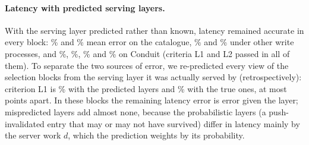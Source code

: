 \documentclass[acmsmall,review,nonacm]{acmart}
\begin{document}
\paragraph{Latency with predicted serving layers.}
With the serving layer predicted rather than known, latency remained accurate in every block: \revTLone\% and \revRLone\% mean error on the catalogue, \revBTwoTLone\% and \revBTwoRLone\% under other write processes, and \cdTLone\%, \cdRLone\%, \cdHTLone\% and \cdHRLone\% on Conduit (criteria L1 and L2 passed in all of them). To separate the two sources of error, we re-predicted every view of the \decBlocks{} selection blocks from the serving layer it was actually served by (retrospectively): criterion L1 is \decLonePred\% with the predicted layers and \decLoneTrue\% with the true ones, at most \decLoneGap{} points apart. In these blocks the remaining latency error is error given the layer; mispredicted layers add almost none, because the probabilistic layers (a push-invalidated entry that may or may not have survived) differ in latency mainly by the server work $d$, which the prediction weights by its probability.
\end{document}
